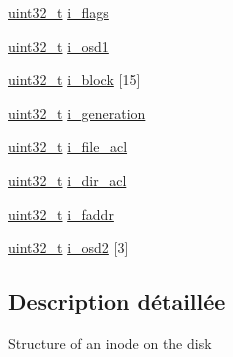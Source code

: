 \begin{DoxyCompactItemize}
\item 
\hyperlink{types_8h_a33594304e786b158f3fb30289278f5af}{uint32\-\_\-t} \hyperlink{structext2__inode_a2037da1edbe1d421dd4453f84cb973e6}{i\-\_\-flags}
\item 
\hyperlink{types_8h_a33594304e786b158f3fb30289278f5af}{uint32\-\_\-t} \hyperlink{structext2__inode_ab06178218f59df43b3d80ad53edc6105}{i\-\_\-osd1}
\item 
\hyperlink{types_8h_a33594304e786b158f3fb30289278f5af}{uint32\-\_\-t} \hyperlink{structext2__inode_a3e2386992eeb6a3b6aa5e282c50221c7}{i\-\_\-block} \mbox{[}15\mbox{]}
\item 
\hyperlink{types_8h_a33594304e786b158f3fb30289278f5af}{uint32\-\_\-t} \hyperlink{structext2__inode_a551df9f3b8f61eb5840eeeb5921c69fb}{i\-\_\-generation}
\item 
\hyperlink{types_8h_a33594304e786b158f3fb30289278f5af}{uint32\-\_\-t} \hyperlink{structext2__inode_aee0fba48998e7d27b836d04ee53e4463}{i\-\_\-file\-\_\-acl}
\item 
\hyperlink{types_8h_a33594304e786b158f3fb30289278f5af}{uint32\-\_\-t} \hyperlink{structext2__inode_a11c2793c33c6ce3f13a5f046e246fd47}{i\-\_\-dir\-\_\-acl}
\item 
\hyperlink{types_8h_a33594304e786b158f3fb30289278f5af}{uint32\-\_\-t} \hyperlink{structext2__inode_a3c921d50835f4869a08444b7e8b01043}{i\-\_\-faddr}
\item 
\hyperlink{types_8h_a33594304e786b158f3fb30289278f5af}{uint32\-\_\-t} \hyperlink{structext2__inode_a6f05264ef1f6a42a6975a858d1aa17c3}{i\-\_\-osd2} \mbox{[}3\mbox{]}
\end{DoxyCompactItemize}


\subsection{Description détaillée}
Structure of an inode on the disk 

